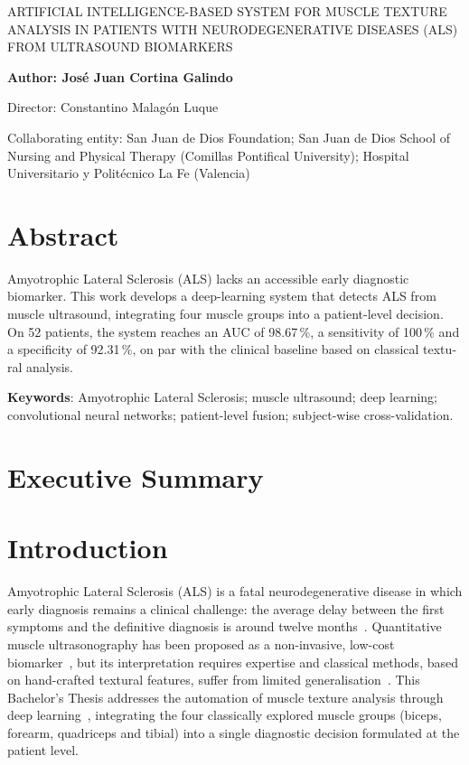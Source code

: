 \documentclass[12pt]{extarticle}
\numberwithin{equation}{section}
\newcommand{\projectTitleEnglish}{Artificial Intelligence-based System for Muscle Texture Analysis in Patients with Neurodegenerative Diseases (ALS) from Ultrasound Biomarkers}
\newcommand{\Author}{Jos\'e Juan Cortina Galindo}
\newcommand{\Director}{Constantino Malag\'on Luque}
\newcommand{\sectionnotoc}[1]{%
    \refstepcounter{section}%
    \section*{\thesection\quad #1}%
}
\begin{document}
\begin{otherlanguage}{english}

{\large \MakeUppercase{\projectTitleEnglish}}
\vspace{3mm}

\textbf{Author: \Author}

Director: \Director

\vspace{2mm}
Collaborating entity: San Juan de Dios Foundation; San Juan de Dios School of Nursing and Physical Therapy (Comillas Pontifical University); Hospital Universitario y Polit\'ecnico La Fe (Valencia)

\begin{refsection}
\renewcommand{\theHsection}{en.\arabic{section}}
\renewcommand{\theHfigure}{en.\arabic{figure}}
\renewcommand{\theHtable}{en.\arabic{table}}
\renewcommand{\theHequation}{en.\arabic{equation}}

\section*{Abstract}
Amyotrophic Lateral Sclerosis (ALS) lacks an accessible early diagnostic biomarker. This work develops a deep-learning system that detects ALS from muscle ultrasound, integrating four muscle groups into a patient-level decision. On 52 patients, the system reaches an AUC of 98.67\,\%, a sensitivity of 100\,\% and a specificity of 92.31\,\%, on par with the clinical baseline based on classical textural analysis.

\textbf{Keywords}: Amyotrophic Lateral Sclerosis; muscle ultrasound; deep learning; convolutional neural networks; patient-level fusion; subject-wise cross-validation.

\section*{Executive Summary}

\sectionnotoc{Introduction}

Amyotrophic Lateral Sclerosis (ALS) is a fatal neurodegenerative disease in which early diagnosis remains a clinical challenge: the average delay between the first symptoms and the definitive diagnosis is around twelve months~\cite{hardiman2017als}. Quantitative muscle ultrasonography has been proposed as a non-invasive, low-cost biomarker~\cite{pillen2008muscle}, but its interpretation requires expertise and classical methods, based on hand-crafted textural features, suffer from limited generalisation~\cite{martinezpaya2017quantitative}. This Bachelor's Thesis addresses the automation of muscle texture analysis through deep learning~\cite{litjens2017survey}, integrating the four classically explored muscle groups (biceps, forearm, quadriceps and tibial) into a single diagnostic decision formulated at the patient level.


\end{refsection}
\end{otherlanguage}
\end{document}

